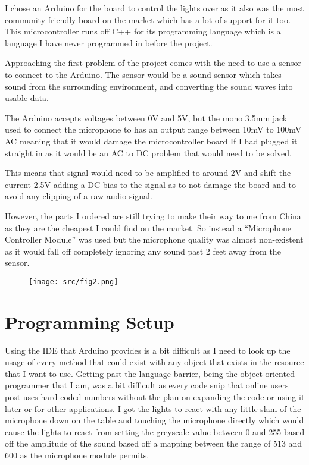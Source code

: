\documentclass[conference]{IEEEtran}
\begin{document}
I chose an Arduino for the board to control the lights over as it also was the most community friendly board on the market which has a lot of support for it too. This microcontroller runs off C++ for its programming language which is a language I have never programmed in before the project.

Approaching the first problem of the project comes with the need to use a sensor to connect to the Arduino. The sensor would be a sound sensor which takes sound from the surrounding environment, and converting the sound waves into usable data.

The Arduino accepts voltages between 0V and 5V, but the mono 3.5mm jack used to connect the microphone to has an output range between 10mV to 100mV AC meaning that it would damage the microcontroller board If I had plugged it straight in as it would be an AC to DC problem that would need to be solved.

This means that signal would need to be amplified to around 2V and shift the current 2.5V adding a DC bias to the signal as to not damage the board and to avoid any clipping of a raw audio signal.

However, the parts I ordered are still trying to make their way to me from China as they are the cheapest I could find on the market. So instead a “Microphone Controller Module” was used but the microphone quality was almost non-existent as it would fall off completely ignoring any sound past 2 feet away from the sensor.

\begin{figure}[H]
	\centering
	\texttt{[image: src/fig2.png]}
\end{figure}

\section{Programming Setup}
Using the IDE that Arduino provides is a bit difficult as I need to look up the usage of every method that could exist with any object that exists in the resource that I want to use. Getting past the language barrier, being the object oriented programmer that I am, was a bit difficult as every code snip that online users post uses hard coded numbers without the plan on expanding the code or using it later or for other applications. I got the lights to react with any little slam of the microphone down on the table and touching the microphone directly which would cause the lights to react from setting the greyscale value between 0 and 255 based off the amplitude of the sound based off a mapping between the range of 513 and 600 as the microphone module permits.
\end{document}
